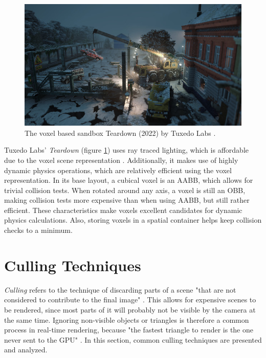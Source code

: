 \begin{figure}[h]
    \centering
    \includegraphics[width=\linewidth]{images/graphics/teardown.jpg}
    \caption{The voxel based sandbox Teardown (2022) by Tuxedo Labs \cite{TuxedoLabs2022}.}
    \label{fig:teardown}
\end{figure}

\noindent
Tuxedo Labs' \emph{Teardown} (figure \ref{fig:teardown}) uses ray traced lighting, which is affordable due 
to the voxel scene representation \cite{TuxedoLabs2022}. Additionally, it makes use of highly dynamic physics 
operations, which are relatively efficient using the voxel representation. In its base layout, a cubical 
voxel is an \ac{AABB}, which allows for trivial collision tests. When rotated around any axis, a voxel is 
still an \ac{OBB}, making collision tests more expensive than when using \ac{AABB}, but still rather efficient. 
These characteristics make voxels excellent candidates for dynamic physics calculations. Also, storing voxels in 
a spatial container helps keep collision checks to a minimum.


\section{Culling Techniques} \label{sec-culling-techniques}

\emph{Culling} refers to the technique of discarding parts of a scene "that are not considered to contribute to 
the final image" \cite{AkenineMoeller2018}. This allows for expensive scenes to be rendered, since most parts of it 
will probably not be visible by the camera at the same time. Ignoring non-visible objects or triangles is therefore a 
common process in real-time rendering, because "the fastest triangle to render is the one never sent to the \ac{GPU}" 
\cite{AkenineMoeller2018}. In this section, common culling techniques are presented and analyzed. 


